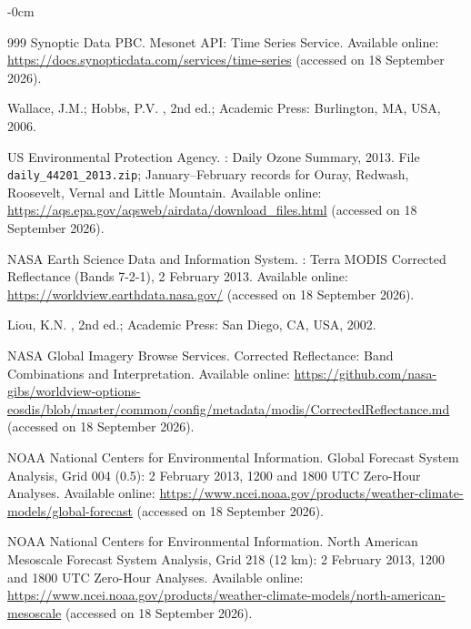 \documentclass[air,article,accept,moreauthors]{Definitions/mdpi}
\begin{document}
\begin{adjustwidth}{-\extralength}{0cm}
\begin{thebibliography}{999}
{Synoptic Data PBC}.
\newblock Mesonet {API}: Time Series Service.
Available online: 
\newblock \url{https://docs.synopticdata.com/services/time-series}      (accessed on 18 September 2026).

Wallace, J.M.; Hobbs, P.V.
, 2nd ed.; Academic Press: Burlington, MA, USA,  2006.

{US Environmental Protection Agency}.
: Daily Ozone Summary, 2013. File \texttt{daily\_44201\_2013.zip}; January--February records for Ouray, Redwash, Roosevelt, Vernal and Little Mountain.
Available online:
\newblock \url{https://aqs.epa.gov/aqsweb/airdata/download_files.html}      (accessed on 18 September 2026).
\newblock 

{NASA Earth Science Data and Information System}.
: {Terra MODIS} Corrected Reflectance (Bands 7-2-1), 2 February 2013.
Available online:
\newblock \url{https://worldview.earthdata.nasa.gov/} (accessed on 18 September 2026).

Liou, K.N.
, 2nd ed.; Academic Press: San Diego, CA, USA,  2002.

{NASA Global Imagery Browse Services}.
 Corrected Reflectance: Band Combinations and Interpretation.
Available online:
\newblock \url{https://github.com/nasa-gibs/worldview-options-eosdis/blob/master/common/config/metadata/modis/CorrectedReflectance.md} (accessed on 18 September 2026).

{NOAA National Centers for Environmental Information}.
\newblock Global Forecast System Analysis, Grid 004 (0.5{\textdegree}): 2 February 2013, 1200 and 1800 {UTC} Zero-Hour Analyses.
Available online:
\newblock \url{https://www.ncei.noaa.gov/products/weather-climate-models/global-forecast} (accessed on 18 September 2026).

{NOAA National Centers for Environmental Information}.
\newblock North American Mesoscale Forecast System Analysis, Grid 218 (12 km): 2 February 2013, 1200 and 1800 {UTC} Zero-Hour Analyses.
Available online:
\newblock \url{https://www.ncei.noaa.gov/products/weather-climate-models/north-american-mesoscale} (accessed on 18 September 2026).


\end{thebibliography}
\end{adjustwidth}
\end{document}
